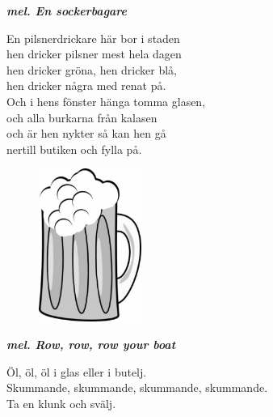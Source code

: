 \documentclass[a6paper,10pt]{article}
\newcommand{\mel}[1]{\small\textbf{\textit{mel. #1 \\}}}
\begin{document}
\setlength{\oddsidemargin}{-0.37in}
\begin{center}
    \mel{En sockerbagare}
\end{center}
\begin{lyrics}
En pilsnerdrickare här bor i staden\\
hen dricker pilsner mest hela dagen\\
hen dricker gröna, hen dricker blå,\\
hen dricker några med renat på.\\
Och i hens fönster hänga tomma glasen,\\
och alla burkarna från kalasen\\
och är hen nykter så kan hen gå\\
nertill butiken och fylla på.
\end{lyrics}
\begin{figure}[!h]
\hspace{30pt}\includegraphics[width=0.3\textwidth]{ol.jpg}
\end{figure}
\begin{center}
    \mel{Row, row, row your boat}
\end{center}
\begin{lyrics}
Öl, öl, öl i glas eller i butelj.\\
Skummande, skummande, skummande, skummande.\\
Ta en klunk och svälj.
\end{lyrics}
\end{document}

